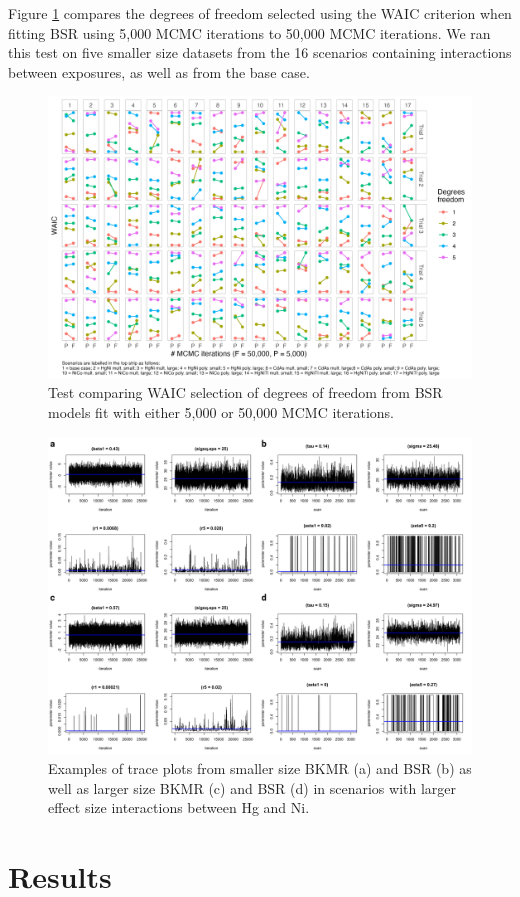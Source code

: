 \documentclass[12pt, twoside]{amherstthesis}
\begin{document}
Figure \ref{fig:comparedf} compares the degrees of freedom selected using the WAIC criterion when fitting BSR using 5,000 MCMC iterations to 50,000 MCMC iterations. We ran this test on five smaller size datasets from the 16 scenarios containing interactions between exposures, as well as from the base case.
\begin{figure}

{\centering \includegraphics[width=1\linewidth]{figures/test_waic2} 

}

\caption{Test comparing WAIC selection of degrees of freedom from BSR models fit with either 5,000 or 50,000 MCMC iterations.}\label{fig:comparedf}
\end{figure}
\begin{figure}

{\centering \includegraphics[width=1\linewidth]{figures/traceplots/bksm_traceplotmerged} 

}

\caption{Examples of trace plots from smaller size BKMR (a) and BSR (b) as well as larger size BKMR (c) and BSR (d) in scenarios with larger effect size interactions between Hg and Ni.}\label{fig:traceplots}
\end{figure}
\hypertarget{suppresults}{%
\section{Results}\label{suppresults}}
\end{document}
